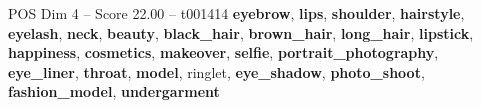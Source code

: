 \begin{textsample}{POS Dim 4 – Score 22.00 – t001414}  \label{ex:f4_pos_014}
\textbf{eyebrow}, \textbf{lips}, \textbf{shoulder}, \textbf{hairstyle}, \textbf{eyelash}, \textbf{neck}, \textbf{beauty}, \textbf{black\_hair}, \textbf{brown\_hair}, \textbf{long\_hair}, \textbf{lipstick}, \textbf{happiness}, \textbf{cosmetics}, \textbf{makeover}, \textbf{selfie}, \textbf{portrait\_photography}, \textbf{eye\_liner}, \textbf{throat}, \textbf{model}, ringlet, \textbf{eye\_shadow}, \textbf{photo\_shoot}, \textbf{fashion\_model}, \textbf{undergarment}

\end{textsample}
